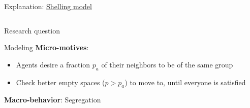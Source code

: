 \documentclass[compress]{beamer}
\begin{document}
\begin{frame}{Explanation: \href{https://github.com/CinkerZX/BasicNetLogoSimModels}{Shelling model\cite{schelling1971dynamic}}}
\begin{columns}[c]
\begin{column}{.5\textwidth}
\begin{minipage}{5.8cm}
\begin{block}{Research question}
                \end{block}
                \begin{block}{Modeling}
                    \textbf{Micro-motives}:\\
                    \begin{itemize}
                        \item Agents desire a fraction $ p_a $ of their neighbors to be of the same group
                        \item Check better empty spaces ($ p > p_{a} $) to move to, until everyone is satisfied
                    \end{itemize}
                    \textbf{Macro-behavior}: Segregation
                \end{block}
            \end{minipage}
        \end{column}
    \end{columns}
\end{frame}
\end{document}
